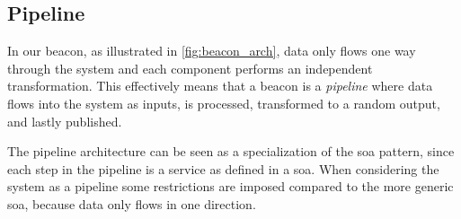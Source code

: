 \subsection{Pipeline}%
\label{sub:pipeline}
In our beacon, as illustrated in \cref{fig:beacon_arch}, data only flows one way through the system and each component performs an independent transformation.
This effectively means that a beacon is a \emph{pipeline} where data flows into the system as inputs, is processed, transformed to a random output, and lastly published.

The pipeline architecture can be seen as a specialization of the \gls{soa} pattern, since each step in the pipeline is a service as defined in a \gls{soa}. When considering the system as a pipeline some restrictions are imposed compared to the more generic \gls{soa}, because data only flows in one direction. 
